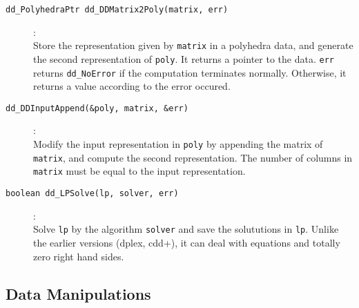 \documentclass[11pt]{article}
\newcommand {\0} {{\bf 0}}
\begin{document}
\begin{description}
\item[{\tt dd\_PolyhedraPtr dd\_DDMatrix2Poly(matrix, err)}]:\\
Store the representation given by {\tt matrix} in a polyhedra data, and
generate the second representation of {\tt *poly}.  It returns
a pointer to the data. {\tt *err}
returns {\tt dd\_NoError} if the computation terminates normally.  Otherwise,
it returns a value according to the error occured.

\item[{\tt dd\_DDInputAppend(\&poly, matrix, \&err)}]:\\
Modify the input representation in {\tt *poly}
by appending the matrix of {\tt *matrix}, and compute
the second representation.  The number of columns in
{\tt *matrix} must be equal to the input representation.

\item[{\tt boolean dd\_LPSolve(lp, solver, err)}]:\\
Solve {\tt lp} by the algorithm {\tt solver} and save
the solututions in {\tt *lp}.  Unlike the earlier versions
(dplex, cdd+), it can deal with equations and totally zero right
hand sides.
\end{description}


\subsection{Data Manipulations}  \label{DataLibrary}
\end{document}
